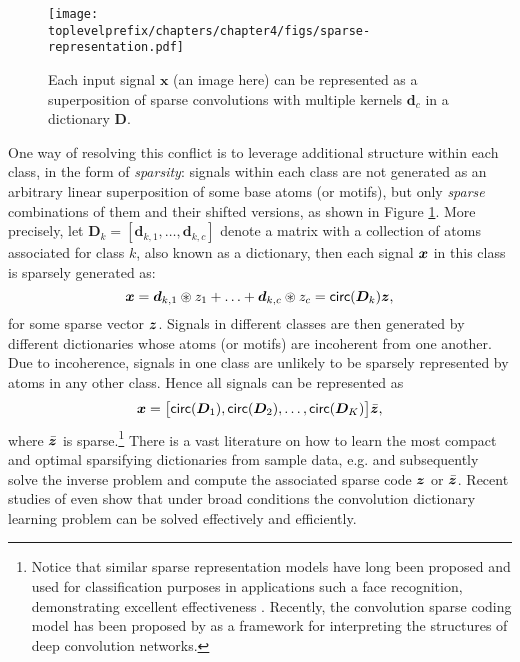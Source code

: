 \documentclass[\toplevelprefix/book-main.tex]{subfiles}
\begin{document}
\begin{figure}[t]
	\centerline{
\texttt{[image: \\toplevelprefix/chapters/chapter4/figs/sparse-representation.pdf]}}
	\caption{Each input signal $\bm x$ (an image here) can be represented as a superposition of sparse convolutions with multiple kernels $\bm d_c$ in a dictionary $\bm D$.}
	\label{fig:multi-channel-sparse-representation}
\end{figure}
One way of resolving this conflict is to leverage additional structure within each class, in the form of {\em sparsity}: signals within each class are not generated as an arbitrary linear superposition of some base atoms (or motifs), but only {\em sparse} combinations of them and their shifted versions, as shown in Figure \ref{fig:multi-channel-sparse-representation}. More precisely, let $\bm D_k = [\bm d_{k,1}, \ldots, \bm d_{k,c}]$ denote a matrix with a collection of atoms associated for class $k$, also known as a dictionary, then each signal $\bm{x}$ in this class is sparsely generated as: 
\begin{equation}
    \bm{x} = \bm d_{k,1} \circledast z_1 + \ldots + \bm d_{k,c} \circledast z_c = \mathsf{circ}(\bm{D}_k)\bm{z},
\end{equation}
for some sparse vector $\bm{z}$. Signals in different classes are then generated by different dictionaries whose atoms (or motifs) are incoherent from one another. Due to incoherence, signals in one class are unlikely to be sparsely represented by atoms in any other class. Hence all signals can be represented as
\begin{equation}
\bm{x} = \big[\mathsf{circ}(\bm{D}_1), \mathsf{circ}(\bm{D}_2), \ldots, \mathsf{circ}(\bm{D}_K)\big] \bar {\bm{z}},
\end{equation}
where $\bar {\bm{z}}$ is sparse.\footnote{Notice that similar sparse representation models have long been proposed and used for classification purposes in applications such a face recognition, demonstrating excellent effectiveness  \cite{Wright:2009,wagner2012toward}. Recently, the convolution sparse coding model has been proposed by \cite{papyan2017convolutional} as a framework for interpreting the structures of deep convolution networks.} There is a vast literature on how to learn the most compact and optimal sparsifying dictionaries from sample data, e.g.  \cite{li2019multichannel,qu2019nonconvex} and subsequently solve the inverse problem and compute the associated sparse code $\bm{z}$ or $\bar {\bm{z}}$. Recent studies of \cite{qu2020nonconvex,Qu2020Geometric} even show that under broad conditions the convolution dictionary learning problem can be solved effectively and efficiently. 
\end{document}
